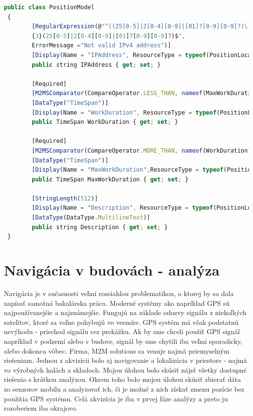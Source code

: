 \documentclass[11pt, oneside]{report}
\begin{document}
\begin{lstlisting}[language=Javascript,showstringspaces=false, caption= Časť modelu pozície s ukážkou validačných atribútov,captionpos=b]
 public class PositionModel
 {        
        [RegularExpression(@"^((25[0-5]|2[0-4][0-9]|[01]?[0-9][0-9]?)\.)
        {3}(25[0-5]|2[0-4][0-9]|[01]?[0-9][0-9]?)$", 
        ErrorMessage ="Not valid IPv4 address")]
        [Display(Name = "IPAddress", ResourceType = typeof(PositionLocale))]
        public string IPAddress { get; set; }

        [Required]
        [M2MSComparator(CompareOperator.LESS_THAN, nameof(MaxWorkDuration))]
        [DataType("TimeSpan")]
        [Display(Name = "WorkDuration", ResourceType = typeof(PositionLocale))]
        public TimeSpan WorkDuration { get; set; }

        [Required]
        [M2MSComparator(CompareOperator.MORE_THAN, nameof(WorkDuration))]
        [DataType("TimeSpan")]
        [Display(Name = "MaxWorkDuration",ResourceType = typeof(PositionLocale))]
        public TimeSpan MaxWorkDuration { get; set; }
        
        [StringLength(512)]
        [Display(Name = "Description", ResourceType = typeof(PositionLocale))]
        [DataType(DataType.MultilineText)]
        public string Description { get; set; }        
 }
\end{lstlisting}
\section{Navigácia v budovách - analýza}
Navigácia je v sučasnosti veľmi rozsiahlou problematikou, o ktorej by sa dala napísať samotná bakalárska práca. Moderné systémy ako napríklad GPS  sú najpoužívanejšie a najznámejšie. Fungujú  na základe odozvy signálu z niekoľkých satelitov, ktoré sa voľne pohybujú vo vesmíre.  GPS systém  má však podstatnú nevýhodu - priechod signálu cez prekážku. Ak by sme chceli použiť GPS signál  napríklad v podzemí alebo v budove, signál by sme  chytili iba veľmi sporadicky, alebo dokonca vôbec. Firma, M2M solutions sa venuje najmä priemyselným riešeniam. Jednou z akvizícii bolo  aj navigovanie  a lokalizácia v priestore - najmä vo výrobných  halách a skladoch. Mojou úlohou bolo skúsiť  nájsť všetky dostupné riešenia  s krátkou analýzou. Okrem toho bolo mojou úlohou skúsiť zbierať dáta zo senzorov mobilu  a analyzovať ich, či je možné z nich získať  zmenu  pozície bez použitia GPS systému. Celá akvizícia je iba v prvej  fáze  analýzy a preto ju rozoberiem iba okrajovo. 
\end{document}
